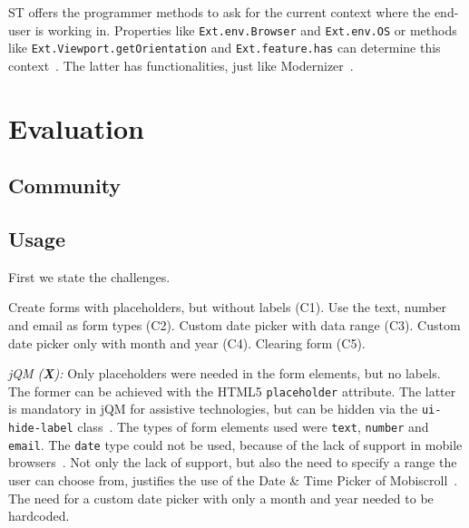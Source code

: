 \documentclass[a4paper]{artikel3}
\newcommand{\code}[1]{\texttt{#1}}
\renewcommand{\paragraph}[1]{\vspace{2mm} \noindent {\bf #1}  }
\newcommand{\framework}[2]{ \emph{#1 (\textbf{#2}): }} %
\newcommand{\challenge}[1]{\paragraph{#1}}
\begin{document}
ST offers the programmer methods to ask for the current context where the end-user is working in.  Properties like \code{Ext.env.Browser} and \code{Ext.env.OS} or methods like \code{Ext.Viewport.getOrientation} and \code{Ext.feature.has} can determine this context~\cite{JohnEClark2012}.  The latter has functionalities,  just like Modernizer~\cite{Modernizr2012}.  


\section{Evaluation}

\subsection{Community} %
\label{sec:community}



\subsection{Usage} %
\label{sec:poc}
First we state the challenges.

\challenge{Forms (C1,C2,C3,C4,C5)}
Create forms with placeholders, but without labels (C1).
Use the text, number and email as form types (C2).
Custom date picker with data range (C3).
Custom date picker only with month and year (C4).
Clearing form (C5).

\framework{jQM}{X}
Only placeholders were needed in the form elements, but no labels.
The former can be achieved with the HTML5 \code{placeholder} attribute.
The latter is mandatory in jQM for assistive technologies, but can be hidden via the \code{ui-hide-label} class~\cite{JQuery2013}. 
The types of form elements used were \code{text}, \code{number} and \code{email}.
The \code{date} type could not be used, because of the lack of support in mobile browsers~\cite{Deveria2013b}.
Not only the lack of support, but also the need to specify a range the user can choose from, justifies the use of the Date \& Time Picker of Mobiscroll~\cite{Mobiscroll2013}.
The need for a custom date picker with only a month and year needed to be hardcoded.
\end{document}

